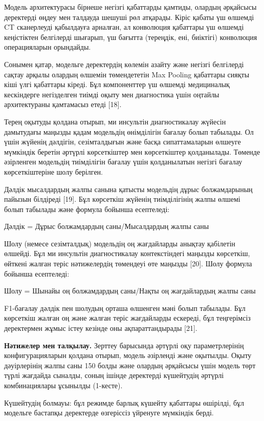 Модель архитектурасы бірнеше негізгі қабаттарды қамтиды, олардың
әрқайсысы деректерді өңдеу мен талдауда шешуші рөл атқарады. Кіріс
қабаты үш өлшемді CT сканерлеуді қабылдауға арналған, ал конволюция
қабаттары үш өлшемді кеңістіктен белгілерді шығарып, үш бағытта
(тереңдік, ені, биіктігі) конволюция операцияларын орындайды.

Сонымен қатар, модельге деректердің көлемін азайту және негізгі
белгілерді сақтау арқылы олардың өлшемін төмендететін Max Pooling
қабаттары сияқты кіші үлгі қабаттары кіреді. Бұл компоненттер үш өлшемді
медициналық кескіндерге негізделген тиімді оқыту мен диагностика үшін
оңтайлы архитектураны қамтамасыз етеді {[}18{]}.

Терең оқытуды қолдана отырып, ми инсультін диагностикалау жүйесін
дамытудағы маңызды қадам модельдің өнімділігін бағалау болып табылады.
Ол үшін жүйенің дәлдігін, сезімталдығын және басқа сипаттамаларын
өлшеуге мүмкіндік беретін әртүрлі көрсеткіштер мен көрсеткіштер
қолданылады. Төменде әзірленген модельдің тиімділігін бағалау үшін
қолданылатын негізгі бағалау көрсеткіштеріне шолу берілген.

Дәлдік мысалдардың жалпы санына қатысты модельдің дұрыс болжамдарының
пайызын білдіреді {[}19{]}. Бұл көрсеткіш жүйенің тиімділігінің жалпы
өлшемі болып табылады және формула бойынша есептеледі:

Дәлдік = Дұрыс болжамдардың саны/Мысалдардың жалпы саны

Шолу (немесе сезімталдық) модельдің оң жағдайларды анықтау қабілетін
өлшейді. Бұл ми инсультін диагностикалау контекстіндегі маңызды
көрсеткіш, өйткені жалған теріс нәтижелердің төмендеуі өте маңызды
{[}20{]}. Шолу формула бойынша есептеледі:

Шолу = Шынайы оң болжамдардың саны/Нақты оң жағдайлардың жалпы саны

F1-бағалау дәлдік пен шолудың орташа өлшенген мәні болып табылады. Бұл
көрсеткіш жалған оң және жалған теріс жағдайларды ескереді, бұл
теңгерімсіз деректермен жұмыс істеу кезінде оны ақпараттандырады
{[}21{]}.

\hspace{0pt} \textbf{Нәтижелер мен талқылау.} Зерттеу барысында әртүрлі
оқу параметрлерінің конфигурацияларын қолдана отырып, модель әзірленді
және оқытылды. Оқыту дәуірлерінің жалпы саны 150 болды және олардың
әрқайсысы үшін модель төрт түрлі жағдайда сыналды, соның ішінде
деректерді күшейтудің әртүрлі комбинациялары ұсынылды (1-кесте).

Күшейтудің болмауы: бұл режимде барлық күшейту қабаттары өшірілді, бұл
модельге бастапқы деректерде өзгеріссіз үйренуге мүмкіндік берді.

